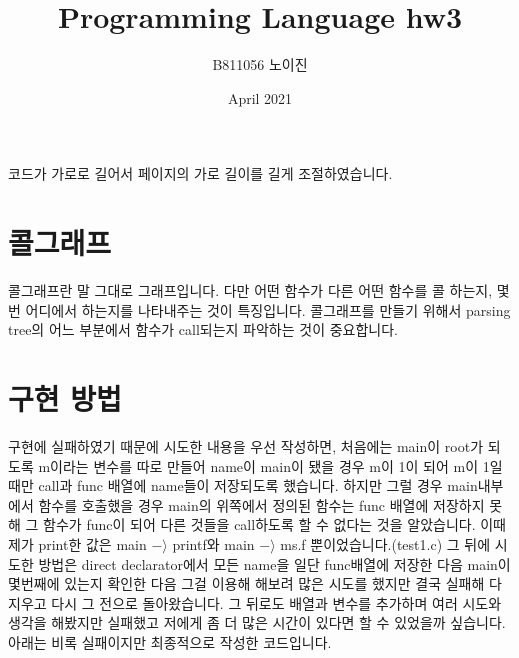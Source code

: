 \documentclass{article}
\title{Programming Language hw3}
\author{B811056 노이진}
\date{April 2021}
\begin{document}
\maketitle

코드가 가로로 길어서 페이지의 가로 길이를 길게 조절하였습니다.

\section{콜그래프}
콜그래프란 말 그대로 그래프입니다. 다만 어떤 함수가 다른 어떤 함수를 콜 하는지, 몇번 어디에서 하는지를 나타내주는 것이 특징입니다. 콜그래프를 만들기 위해서 parsing tree의 어느 부분에서 함수가 call되는지 파악하는 것이 중요합니다.

\section{구현 방법}
 구현에 실패하였기 때문에 시도한 내용을 우선 작성하면, 처음에는 main이 root가 되도록 m이라는 변수를 따로 만들어 name이 main이 됐을 경우 m이 1이 되어 m이 1일 때만 call과 func 배열에 name들이 저장되도록 했습니다. 하지만 그럴 경우 main내부에서 함수를 호출했을 경우 main의 위쪽에서 정의된 함수는 func 배열에 저장하지 못해 그 함수가 func이 되어 다른 것들을 call하도록 할 수 없다는 것을 알았습니다. 이때 제가 print한 값은 main $-\rangle$ printf와 main $-\rangle$ ms.f 뿐이었습니다.(test1.c) 그 뒤에 시도한 방법은 direct declarator에서 모든 name을 일단 func배열에 저장한 다음 main이 몇번째에 있는지 확인한 다음 그걸 이용해 해보려 많은 시도를 했지만 결국 실패해 다 지우고 다시 그 전으로 돌아왔습니다. 그 뒤로도 배열과 변수를 추가하며 여러 시도와 생각을 해봤지만 실패했고 저에게 좀 더 많은 시간이 있다면 할 수 있었을까 싶습니다. 아래는 비록 실패이지만 최종적으로 작성한 코드입니다.
 
\end{document}
